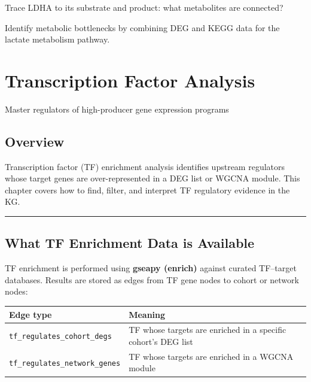 \documentclass[
  letterpaper,
  oneside,
  open=any]{scrbook}
\newcounter{none} %
\begin{document}
Trace LDHA to its substrate and product: what metabolites are connected?

Identify metabolic bottlenecks by combining DEG and KEGG data for the
lactate metabolism pathway.


\chapter{Transcription Factor
Analysis}\label{transcription-factor-analysis}

Master regulators of high-producer gene expression programs

\hfill\break

\section{Overview}\label{sec-tf}

Transcription factor (TF) enrichment analysis identifies upstream
regulators whose target genes are over-represented in a DEG list or
WGCNA module. This chapter covers how to find, filter, and interpret TF
regulatory evidence in the KG.

\begin{center}\rule{0.5\linewidth}{0.5pt}\end{center}

\section{What TF Enrichment Data is
Available}\label{what-tf-enrichment-data-is-available}

TF enrichment is performed using \textbf{gseapy (enrich)} against
curated TF--target databases. Results are stored as edges from TF gene
nodes to cohort or network nodes:

{\def\LTcaptype{none} %
\begin{longtable}[]{@{}
  >{\raggedright\arraybackslash}p{}
  >{\raggedright\arraybackslash}p{}@{}}
\toprule\noalign{}
\begin{minipage}[b]{\linewidth}\raggedright
Edge type
\end{minipage} & \begin{minipage}[b]{\linewidth}\raggedright
Meaning
\end{minipage} \\
\midrule\noalign{}
\endhead
\bottomrule\noalign{}
\endlastfoot
\texttt{tf\_regulates\_cohort\_degs} & TF whose targets are enriched in
a specific cohort's DEG list \\
\texttt{tf\_regulates\_network\_genes} & TF whose targets are enriched
in a WGCNA module \\
\end{longtable}
}
\end{document}
